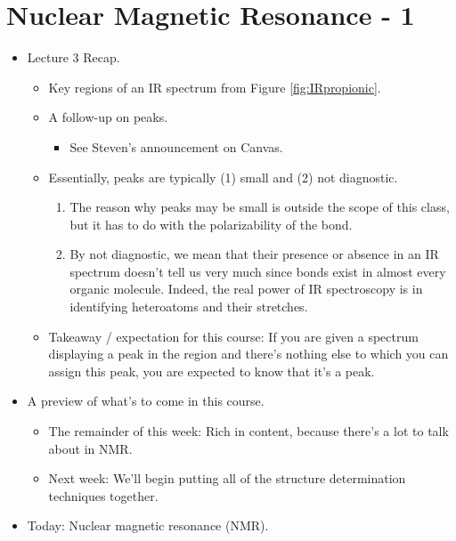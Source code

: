 \documentclass[../notes.tex]{subfiles}
\begin{document}
\section{Nuclear Magnetic Resonance - 1}
\begin{itemize}
    \item {}Lecture 3 Recap.
    \begin{itemize}
        \item Key regions of an IR spectrum from Figure \ref{fig:IRpropionic}.
        \item A follow-up on  peaks.
        \begin{itemize}
            \item See Steven's announcement on Canvas.
        \end{itemize}
        \pagebreak
        \item Essentially,  peaks are typically (1) small and (2) not diagnostic.
        \begin{enumerate}
            \item The reason why  peaks may be small is outside the scope of this class, but it has to do with the polarizability of the  bond.
            \item By not diagnostic, we mean that their presence or absence in an IR spectrum doesn't tell us very much since  bonds exist in almost every organic molecule. Indeed, the real power of IR spectroscopy is in identifying heteroatoms and their stretches.
        \end{enumerate}
        \item Takeaway / expectation for this course: If you are given a spectrum displaying a peak in the  region and there's nothing else to which you can assign this peak, you are expected to know that it's a  peak.
    \end{itemize}
    \item A preview of what's to come in this course.
    \begin{itemize}
        \item The remainder of this week: Rich in content, because there's a lot to talk about in NMR.
        \item Next week: We'll begin putting all of the structure determination techniques together.
    \end{itemize}
    \item Today: Nuclear magnetic resonance (NMR).
    \begin{itemize}

\end{itemize}
\end{itemize}
\end{document}

